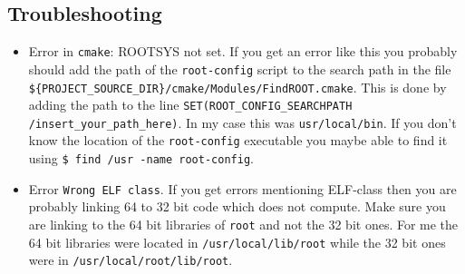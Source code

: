 \subsection{Troubleshooting}
\begin{itemize}
\item Error in \texttt{cmake}: ROOTSYS not set.
If you get an error like this you probably should add the path of the \texttt{root-config} script to the search path in the file \texttt{\$\{PROJECT\_SOURCE\_DIR\}/cmake/Modules/FindROOT.cmake}. This is done by adding the path to the line \texttt{SET(ROOT\_CONFIG\_SEARCHPATH /insert\_your\_path\_here)}. In my case this was \texttt{usr/local/bin}. If you don't know the location of the \texttt{root-config} executable you maybe able to find it using \texttt{\$ find /usr -name root-config}.
\item Error \texttt{Wrong ELF class}. If you get errors mentioning ELF-class then you are probably linking 64 to 32 bit code which does not compute. Make sure you are linking to the 64 bit libraries of \texttt{root} and not the 32 bit ones. For me the 64 bit libraries were located in \texttt{/usr/local/lib/root} while the 32 bit ones were in \texttt{/usr/local/root/lib/root}. 
\end{itemize}
